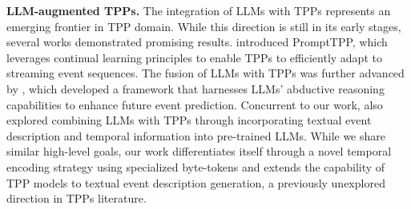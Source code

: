 \textbf{LLM-augmented TPPs.} The integration of LLMs with TPPs represents an emerging frontier in TPP domain. While this direction is still in its early stages, several works demonstrated promising results. \citet{xue2023prompt} introduced PromptTPP, which leverages continual learning principles to enable TPPs to efficiently adapt to streaming event sequences. The fusion of LLMs with TPPs was further advanced by \citet{shi2024language}, which developed a framework that harnesses LLMs' abductive reasoning capabilities to enhance future event prediction. Concurrent to our work, \citet{liu2024tpp} also explored combining LLMs with TPPs through incorporating textual event description and temporal information into pre-trained LLMs. While we share similar high-level goals, our work differentiates itself through a novel temporal encoding strategy using specialized byte-tokens and extends the capability of TPP models to textual event description generation, a previously unexplored direction in TPPs literature. 

